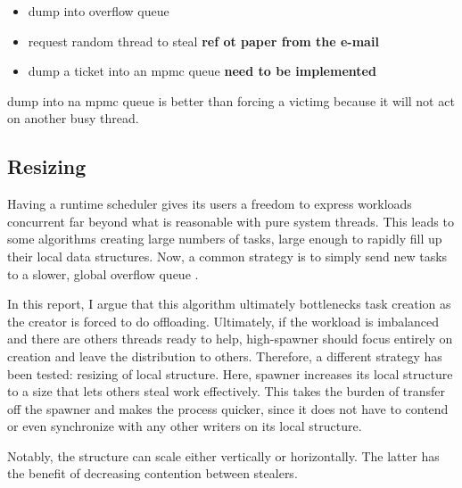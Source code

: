 \documentclass[12pt,a4paper,twoside]{report}
\begin{document}
\begin{itemize}
    \item dump into overflow queue 
    \item request random thread to steal \textbf{ref ot paper from the e-mail}
    \item dump a ticket into an mpmc queue \textbf{need to be implemented}
\end{itemize}

dump into na mpmc queue is better than forcing a victimg because it will not act on another busy thread. 




\subsection{Resizing}
\label{section:resizing}
Having a runtime scheduler gives its users a freedom to express workloads concurrent far beyond what is reasonable with pure system threads. This leads to some algorithms creating large numbers of tasks, large enough to rapidly fill up their local data structures. Now, a common strategy is to simply send new tasks to a slower, global overflow queue .

In this report, I argue that this algorithm ultimately bottlenecks task creation as the creator is forced to do offloading. Ultimately, if the workload is imbalanced and there are others threads ready to help, high-spawner should focus entirely on creation and leave the distribution to others. Therefore, a different strategy has been tested: resizing of local structure. Here, spawner increases its local structure to a size that lets others steal work effectively. This takes the burden of transfer off the spawner and makes the process quicker, since it does not have to contend or even synchronize with any other writers on its local structure. 


Notably, the structure can scale either vertically or horizontally. The latter has the benefit of decreasing contention between stealers.  

\end{document}
